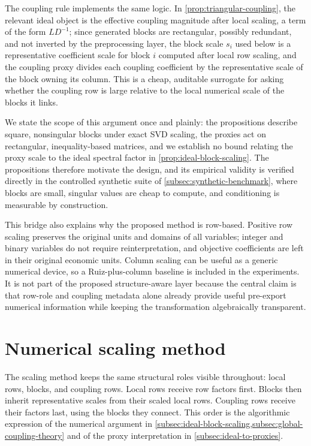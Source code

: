 \documentclass[AMA,Times1COL]{WileyNJDv5} %
\providecommand{\DIFadd}[1]{{\protect\color{blue} \sf #1}} %
\providecommand{\DIFaddbegin}{} %
\providecommand{\DIFaddend}{} %
\begin{document}
\DIFadd{The coupling rule implements the same logic. In \cref{prop:triangular-coupling}, the
relevant ideal object is the effective coupling magnitude after local scaling, a term of
the form $LD^{-1}$; since generated blocks are rectangular, possibly redundant, and not
inverted by the preprocessing layer, the block scale $s_i$ used below is a representative
coefficient scale for block $i$ computed after local row scaling, and the coupling proxy
divides each coupling coefficient by the representative scale of the block owning its
column. This is a cheap, auditable surrogate for asking whether the coupling row is large
relative to the local numerical scale of the blocks it links.
}

\DIFadd{We state the scope of this argument once and plainly: the propositions describe square,
nonsingular blocks under exact SVD scaling, the proxies act on rectangular,
inequality-based matrices, and we establish no bound relating the proxy scale to the
ideal spectral factor in \cref{prop:ideal-block-scaling}. The propositions therefore
motivate the design, and its empirical validity is verified directly in the controlled
synthetic suite of \cref{subsec:synthetic-benchmark}, where blocks are small, singular
values are cheap to compute, and conditioning is measurable by construction.
}

\DIFadd{This bridge also explains why the proposed method is row-based. Positive row scaling
preserves the original units and domains of all variables; integer and binary variables do
not require reinterpretation, and objective coefficients are left in their original
economic units. Column scaling can be useful as a generic numerical device, so a
Ruiz-plus-column baseline is included in the experiments. It is not part of the proposed
structure-aware layer because the central claim is that row-role and coupling metadata
alone already provide useful pre-export numerical information while keeping the
transformation algebraically transparent.
}


\DIFaddend %
\section{Numerical scaling method}
\label{sec:scaling}

The scaling method keeps the same structural roles visible throughout: local rows, blocks, and coupling rows. Local rows receive row factors first. Blocks then inherit representative scales from their scaled local rows. Coupling rows receive their factors last, using the blocks they connect. This order is the algorithmic expression of the numerical argument in \cref{subsec:ideal-block-scaling,subsec:global-coupling-theory} \DIFaddbegin \DIFadd{and of the proxy interpretation in \cref{subsec:ideal-to-proxies}}\DIFaddend .
\end{document}

